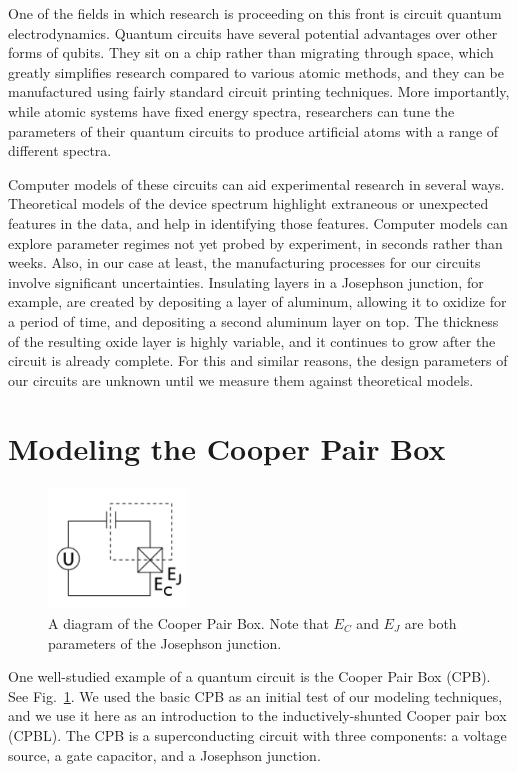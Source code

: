 \documentclass[twocolumn]{revtex4}
\newcommand{\figwidth}{0.33\textwidth}
\begin{document}
One of the fields in which research is proceeding on this front is
circuit quantum electrodynamics. Quantum circuits have several
potential advantages over other forms of qubits. They sit on a chip
rather than migrating through space, which greatly simplifies research
compared to various atomic methods, and they can be manufactured using
fairly standard circuit printing techniques. More importantly, while
atomic systems have fixed energy spectra, researchers can tune the
parameters of their quantum circuits to produce artificial atoms with
a range of different spectra.

Computer models of these circuits can aid experimental research in
several ways. Theoretical models of the device spectrum highlight
extraneous or unexpected features in the data, and help in identifying
those features. Computer models can explore parameter regimes not yet
probed by experiment, in seconds rather than weeks. Also, in our case
at least, the manufacturing processes for our circuits involve
significant uncertainties. Insulating layers in a Josephson junction,
for example, are created by depositing a layer of aluminum, allowing
it to oxidize for a period of time, and depositing a second aluminum
layer on top. The thickness of the resulting oxide layer is highly
variable, and it continues to grow after the circuit is already
complete. For this and similar reasons, the design parameters of our
circuits are unknown until we measure them against theoretical models.

\section{Modeling the Cooper Pair Box}

\begin{figure}
  \includegraphics[width=\figwidth]{CPB-circuit.png}
  \caption{A diagram of the Cooper Pair Box. Note that $E_C$ and $E_J$
    are both parameters of the Josephson junction.}
  \label{cpb-circuit}
\end{figure}

One well-studied example of a quantum circuit is the Cooper Pair Box
(CPB). See Fig.~\ref{cpb-circuit}. We used the basic CPB as an initial
test of our modeling techniques, and we use it here as an introduction
to the inductively-shunted Cooper pair box (CPBL). The CPB is a
superconducting circuit with three components: a voltage source, a
gate capacitor, and a Josephson junction.
\end{document}
